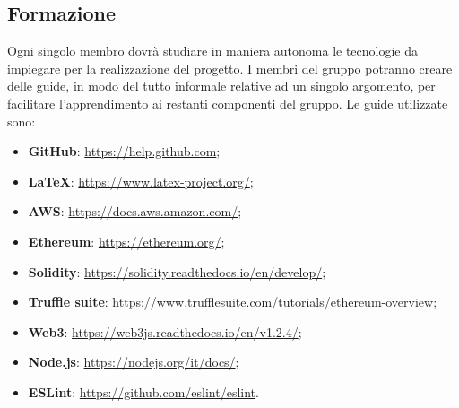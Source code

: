    \subsection{Formazione}

      Ogni singolo membro dovrà studiare in maniera autonoma le tecnologie da impiegare per la realizzazione del progetto. I membri del gruppo potranno creare delle guide, in modo del tutto informale relative ad un singolo argomento, per facilitare l'apprendimento ai restanti componenti del gruppo.
      Le guide utilizzate sono:
      \begin{itemize}
         \item \textbf{GitHub\glos}: \href{https://help.github.com}{https://help.github.com};
         \item \textbf{\LaTeX}: \href{https://www.latex-project.org/}{https://www.latex-project.org/};
         \item \textbf{AWS}: \href{https://docs.aws.amazon.com/}{https://docs.aws.amazon.com/};
         \item \textbf{Ethereum\glos}: \href{https://ethereum.org/}{https://ethereum.org/};
         \item \textbf{Solidity}: \href{https://solidity.readthedocs.io/en/develop/}{https://solidity.readthedocs.io/en/develop/};
         \item \textbf{Truffle suite}: \href{https://www.trufflesuite.com/tutorials/ethereum-overview}{https://www.trufflesuite.com/tutorials/ethereum-overview};
         \item \textbf{Web3}: \href{https://web3js.readthedocs.io/en/v1.2.4/}{https://web3js.readthedocs.io/en/v1.2.4/};
         \item \textbf{Node.js}: \href{https://nodejs.org/it/docs/}{https://nodejs.org/it/docs/};
         \item \textbf{ESLint}: \href{https://github.com/eslint/eslint}{https://github.com/eslint/eslint}.
      \end{itemize}